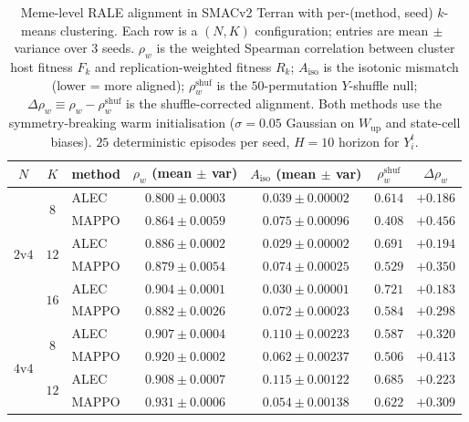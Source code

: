\begin{table}[t]
\centering
\caption{Meme-level RALE alignment in SMACv2 Terran with per-(method, seed)
$k$-means clustering. Each row is a $(N,K)$ configuration; entries are
mean$\,\pm\,$variance over $3$ seeds. $\rho_w$ is the weighted Spearman
correlation between cluster host fitness $F_k$ and replication-weighted
fitness $R_k$; $A_{\mathrm{iso}}$ is the isotonic mismatch (lower = more
aligned); $\rho_w^{\mathrm{shuf}}$ is the $50$-permutation $Y$-shuffle
null; $\Delta\rho_w \equiv \rho_w - \rho_w^{\mathrm{shuf}}$ is the
shuffle-corrected alignment. Both methods use the symmetry-breaking warm
initialisation ($\sigma\!=\!0.05$ Gaussian on $W_{\mathrm{up}}$ and
state-cell biases). $25$ deterministic episodes per seed, $H\!=\!10$
horizon for $Y_i^t$.}
\label{tab:rale-smacv2}
\small
\setlength{\tabcolsep}{4pt}
\begin{tabular}{c c l c c c c}
\toprule
$N$ & $K$ & method & $\rho_w$ (mean$\,\pm\,$var) & $A_{\mathrm{iso}}$ (mean$\,\pm\,$var) & $\rho_w^{\mathrm{shuf}}$ & $\Delta\rho_w$ \\
\midrule
\multirow{6}{*}{$2$v$4$}
 & \multirow{2}{*}{$8$}  & ALEC  & $0.800\pm0.0003$ & $0.039\pm0.00002$ & $0.614$ & $+0.186$ \\
 &                       & MAPPO & $0.864\pm0.0059$ & $0.075\pm0.00096$ & $0.408$ & $+0.456$ \\
 \cmidrule(lr){2-7}
 & \multirow{2}{*}{$12$} & ALEC  & $0.886\pm0.0002$ & $0.029\pm0.00002$ & $0.691$ & $+0.194$ \\
 &                       & MAPPO & $0.879\pm0.0054$ & $0.074\pm0.00025$ & $0.529$ & $+0.350$ \\
 \cmidrule(lr){2-7}
 & \multirow{2}{*}{$16$} & ALEC  & $0.904\pm0.0001$ & $0.030\pm0.00001$ & $0.721$ & $+0.183$ \\
 &                       & MAPPO & $0.882\pm0.0026$ & $0.072\pm0.00023$ & $0.584$ & $+0.298$ \\
\midrule
\multirow{6}{*}{$4$v$4$}
 & \multirow{2}{*}{$8$}  & ALEC  & $0.907\pm0.0004$ & $0.110\pm0.00223$ & $0.587$ & $+0.320$ \\
 &                       & MAPPO & $0.920\pm0.0002$ & $0.062\pm0.00237$ & $0.506$ & $+0.413$ \\
 \cmidrule(lr){2-7}
 & \multirow{2}{*}{$12$} & ALEC  & $0.908\pm0.0007$ & $0.115\pm0.00122$ & $0.685$ & $+0.223$ \\
 &                       & MAPPO & $0.931\pm0.0006$ & $0.054\pm0.00138$ & $0.622$ & $+0.309$ \\

\end{tabular}
\end{table}
